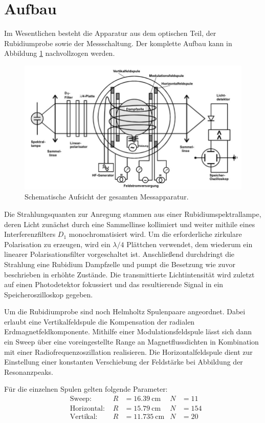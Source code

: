 \section{Aufbau}
\label{sec:Aufbau}

Im Wesentlichen besteht die Apparatur aus dem optischen Teil, der Rubidiumprobe sowie der Messschaltung. Der komplette Aufbau
kann in Abbildung \ref{fig:aufbau} nachvollzogen werden.

\begin{figure}[H]
	\centering
	\includegraphics[width=0.8\linewidth]{content/grafik/aufbau.jpg}
	\caption{Schematische Aufsicht der gesamten Messapparatur. \cite{pumpen}}
	\label{fig:aufbau}
\end{figure}

Die Strahlungsquanten zur Anregung stammen aus einer Rubidiumspektrallampe, deren Licht zunächst durch eine Sammellinse kollimiert
und weiter mithile eines Interferenzfilters $D_1$ monochromatisiert wird. Um die erforderliche zirkulare Polarisation zu
erzeugen, wird ein $\lambda/4$ Plättchen verwendet, dem wiederum ein linearer Polarisationsfilter vorgeschaltet ist. Anschließend
durchdringt die Strahlung eine Rubidium Dampfzelle und pumpt die Besetzung wie zuvor beschrieben in erhöhte Zustände. Die
transmittierte Lichtintensität wird zuletzt auf einen Photodetektor fokussiert und das resultierende Signal in ein
Speicheroszilloskop gegeben. 

Um die Rubidiumprobe sind noch Helmholtz Spulenpaare angeordnet. Dabei erlaubt eine Vertikalfeldspule die Kompensation
der radialen Erdmagnetfeldkomponente. Mithilfe einer Modulationsfeldspule lässt sich dann ein Sweep über eine voreingestellte
Range an Magnetflussdichten in Kombination mit einer Radiofrequenzoszillation realisieren. Die Horizontalfeldspule dient zur
Einstellung einer konstanten Verschiebung der Feldstärke bei Abbildung der Resonanzpeaks. 

Für die einzelnen Spulen gelten folgende Parameter:
\begin{align*}
	&& && && && &\text{Sweep: } & R &= \qty{16.39}{\centi\meter} & N &= \num{11} && && && && \\
	&& && && && &\text{Horizontal: } & R &= \qty{15.79}{\centi\meter} & N &= \num{154} && && && && \\
	&& && && && &\text{Vertikal: } & R &= \qty{11.735}{\centi\meter} & N &= \num{20} && && && &&
\end{align*}
